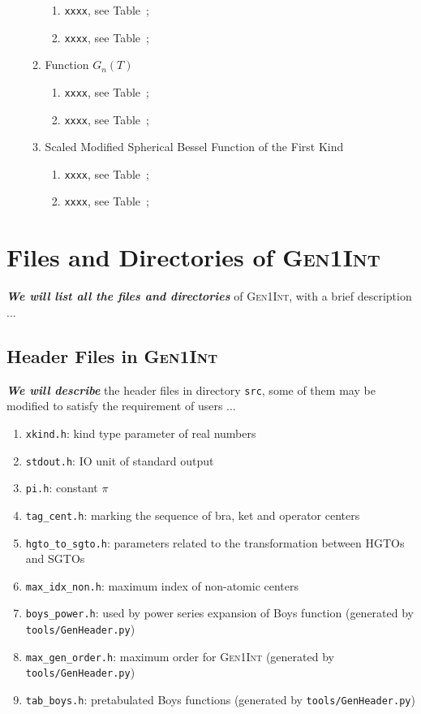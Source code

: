 \documentclass[a4paper,11pt,twoside,openright]{book}
\newcommand{\fixme}[1]{\textbf{\textit{\color{red} #1}}}
\begin{document}
\begin{enumerate}
\begin{enumerate}
\begin{enumerate}
      \item \verb|xxxx|, see Table~;
      \item \verb|xxxx|, see Table~;
    \end{enumerate}
    \item Function $G_{n}(T)$
    \begin{enumerate}
      \item \verb|xxxx|, see Table~;
      \item \verb|xxxx|, see Table~;
    \end{enumerate}
    \item Scaled Modified Spherical Bessel Function of the First Kind
    \begin{enumerate}
      \item \verb|xxxx|, see Table~;
      \item \verb|xxxx|, see Table~;
    \end{enumerate}
  \end{enumerate}
\end{enumerate}

\chapter{Files and Directories of \textsc{Gen1Int}}
\label{chap:gen1int-files}

\fixme{We will list all the files and directories} of \textsc{Gen1Int}, with a brief description ...

\section{Header Files in \textsc{Gen1Int}}
\label{sect:header-files}

\fixme{We will describe} the header files in directory \verb|src|, some of them may be modified to
satisfy the requirement of users ...

\begin{enumerate}
  \item \verb|xkind.h|: kind type parameter of real numbers
  \item \verb|stdout.h|: IO unit of standard output
  \item \verb|pi.h|: constant $\pi$
  \item \verb|tag_cent.h|: marking the sequence of bra, ket and operator centers
  \item \verb|hgto_to_sgto.h|: parameters related to the transformation between HGTOs and SGTOs
  \item \verb|max_idx_non.h|: maximum index of non-atomic centers
  \item \verb|boys_power.h|: used by power series expansion of Boys function (generated by \verb|tools/GenHeader.py|)
  \item \verb|max_gen_order.h|: maximum order for \textsc{Gen1Int} (generated by \verb|tools/GenHeader.py|)
  \item \verb|tab_boys.h|: pretabulated Boys functions (generated by \verb|tools/GenHeader.py|)
\end{enumerate}
\end{document}
